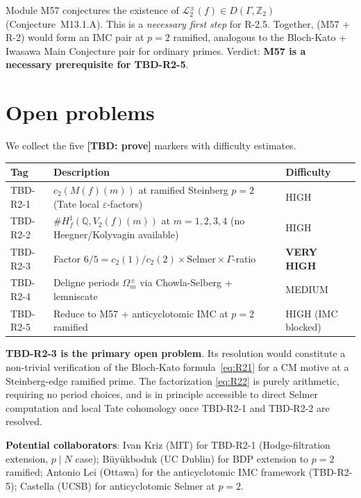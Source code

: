 \documentclass[12pt]{amsart}
\theoremstyle{definition}
\newcommand{\Z}{\mathbb{Z}}
\newcommand{\Q}{\mathbb{Q}}
\begin{document}
Module M57 conjectures the existence of $\mathscr{L}_2^\pm(f) \in D(\Gamma, \Z_2)$
(Conjecture~M13.1.A). This is a \emph{necessary first step} for R-2.5.
Together, (M57 + R-2) would form an IMC pair at $p = 2$ ramified,
analogous to the Bloch-Kato + Iwasawa Main Conjecture pair for ordinary primes.
Verdict: \textbf{M57 is a necessary prerequisite for TBD-R2-5}.

\section{Open problems}
\label{sec:open}

We collect the five \textbf{[TBD: prove]} markers with difficulty estimates.

\begin{center}
\renewcommand{\arraystretch}{1.4}
\begin{tabular}{lll}
\hline
Tag & Description & Difficulty \\
\hline
TBD-R2-1 & $c_2(M(f)(m))$ at ramified Steinberg $p=2$ (Tate local $\varepsilon$-factors) & HIGH \\
TBD-R2-2 & $\#H^1_f(\Q, V_2(f)(m))$ at $m=1,2,3,4$ (no Heegner/Kolyvagin available) & HIGH \\
TBD-R2-3 & Factor $6/5 = c_2(1)/c_2(2) \times \mathrm{Selmer} \times \Gamma$-ratio & \textbf{VERY HIGH} \\
TBD-R2-4 & Deligne periods $\Omega^\pm_m$ via Chowla-Selberg + lemniscate & MEDIUM \\
TBD-R2-5 & Reduce to M57 + anticyclotomic IMC at $p=2$ ramified & HIGH (IMC blocked) \\
\hline
\end{tabular}
\end{center}

\medskip
\noindent\textbf{TBD-R2-3 is the primary open problem}. Its resolution would constitute
a non-trivial verification of the Bloch-Kato formula~\eqref{eq:R21} for a CM motive
at a Steinberg-edge ramified prime. The factorization \eqref{eq:R22} is purely arithmetic,
requiring no period choices, and is in principle accessible to direct Selmer computation
and local Tate cohomology once TBD-R2-1 and TBD-R2-2 are resolved.

\medskip
\noindent\textbf{Potential collaborators}: Ivan Kriz (MIT) for TBD-R2-1
(Hodge-filtration extension, $p \mid N$ case); Büyükboduk (UC Dublin) for
BDP extension to $p=2$ ramified; Antonio Lei (Ottawa) for the anticyclotomic
IMC framework (TBD-R2-5); Castella (UCSB) for anticyclotomic Selmer at $p=2$.
\end{document}
